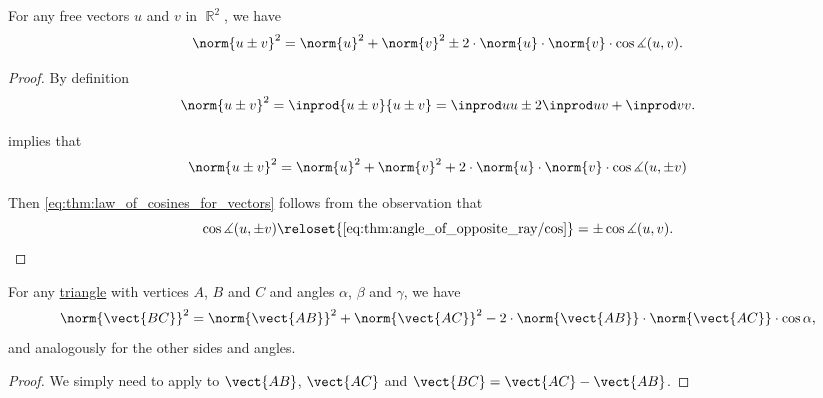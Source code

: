 \begin{theorem}\label{thm:law_of_cosines_for_vectors}
  For any free vectors \( u \) and \( v \) in \( \BbbR^2 \), we have
  \begin{equation}\label{eq:thm:law_of_cosines_for_vectors}
    \norm{u \pm v}^2 = \norm{u}^2 + \norm{v}^2 \pm 2 \cdot \norm{u} \cdot \norm{v} \cdot \cos \measuredangle(u, v).
  \end{equation}
\end{theorem}
\begin{proof}
  By definition
  \begin{equation*}
    \norm{u \pm v}^2
    =
    \inprod{u \pm v} {u \pm v}
    =
    \inprod u u \pm 2 \inprod u v + \inprod v v.
  \end{equation*}

   implies that
  \begin{equation*}
    \norm{u \pm v}^2 = \norm{u}^2 + \norm{v}^2 + 2 \cdot \norm{u} \cdot \norm{v} \cdot \cos \measuredangle(u, \pm v)
  \end{equation*}

  Then \eqref{eq:thm:law_of_cosines_for_vectors} follows from the observation that
  \begin{equation*}
    \cos \measuredangle (u, \pm v)
    \reloset {\eqref{eq:thm:angle_of_opposite_ray/cos}} =
    \pm \cos \measuredangle (u, v).
  \end{equation*}
\end{proof}

\begin{corollary}\label{thm:law_of_cosines_for_triangles}
  For any \hyperref[def:triangle]{triangle} with vertices \( A \), \( B \) and \( C \) and angles \( \alpha \), \( \beta \) and \( \gamma \), we have
  \begin{equation}\label{eq:thm:law_of_cosines_for_triangles}
    \norm{\vect{BC}}^2 = \norm{\vect{AB}}^2 + \norm{\vect{AC}}^2 - 2 \cdot \norm{\vect{AB}} \cdot \norm{\vect{AC}} \cdot \cos \alpha,
  \end{equation}
  and analogously for the other sides and angles.
\end{corollary}
\begin{proof}
  We simply need to apply  to \( \vect{AB} \), \( \vect{AC} \) and \( \vect{BC} = \vect{AC} - \vect{AB} \).
\end{proof}

